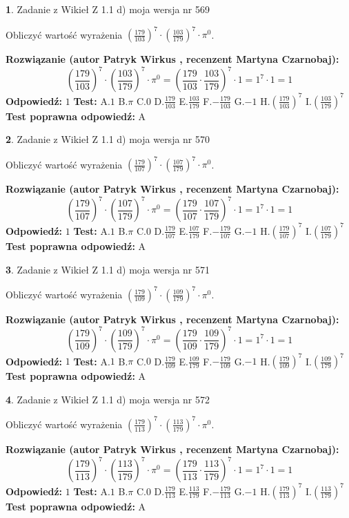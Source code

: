 \documentclass[12pt, a4paper]{article}
\theoremstyle{definition} %
\newtheorem{zad}{}
\newcommand{\zadStart}[1]{\begin{zad}#1\newline}
\newcommand{\zadStop}{\end{zad}}
\newcommand{\rozwStart}[2]{\noindent \textbf{Rozwiązanie (autor #1 , recenzent #2): }\newline}
\newcommand{\rozwStop}{\newline}
\newcommand{\odpStart}{\noindent \textbf{Odpowiedź:}\newline}
\newcommand{\odpStop}{\newline}
\newcommand{\testStart}{\noindent \textbf{Test:}\newline}
\newcommand{\testStop}{\newline}
\newcommand{\kluczStart}{\noindent \textbf{Test poprawna odpowiedź:}\newline}
\newcommand{\kluczStop}{\newline}
\begin{document}
\zadStart{Zadanie z Wikieł Z 1.1 d) moja wersja nr 569}

Obliczyć wartość wyrażenia $(\frac{179}{103})^{7} \cdot (\frac{103}{179})^{7} \cdot \pi^{0}$.
\zadStop
\rozwStart{Patryk Wirkus}{Martyna Czarnobaj}
$$(\frac{179}{103})^{7} \cdot (\frac{103}{179})^{7} \cdot \pi^{0} = (\frac{179}{103} \cdot \frac{103}{179})^{7} \cdot 1 = 1^{7} \cdot 1 = 1$$
\rozwStop
\odpStart
$1$
\odpStop
\testStart
A.$1$ B.$\pi$ C.$0$ D.$\frac{179}{103}$ E.$\frac{103}{179}$
F.$-\frac{179}{103}$ G.$-1$
H.$(\frac{179}{103})^{7}$
I.$(\frac{103}{179})^{7}$
\testStop
\kluczStart
A
\kluczStop



\zadStart{Zadanie z Wikieł Z 1.1 d) moja wersja nr 570}

Obliczyć wartość wyrażenia $(\frac{179}{107})^{7} \cdot (\frac{107}{179})^{7} \cdot \pi^{0}$.
\zadStop
\rozwStart{Patryk Wirkus}{Martyna Czarnobaj}
$$(\frac{179}{107})^{7} \cdot (\frac{107}{179})^{7} \cdot \pi^{0} = (\frac{179}{107} \cdot \frac{107}{179})^{7} \cdot 1 = 1^{7} \cdot 1 = 1$$
\rozwStop
\odpStart
$1$
\odpStop
\testStart
A.$1$ B.$\pi$ C.$0$ D.$\frac{179}{107}$ E.$\frac{107}{179}$
F.$-\frac{179}{107}$ G.$-1$
H.$(\frac{179}{107})^{7}$
I.$(\frac{107}{179})^{7}$
\testStop
\kluczStart
A
\kluczStop



\zadStart{Zadanie z Wikieł Z 1.1 d) moja wersja nr 571}

Obliczyć wartość wyrażenia $(\frac{179}{109})^{7} \cdot (\frac{109}{179})^{7} \cdot \pi^{0}$.
\zadStop
\rozwStart{Patryk Wirkus}{Martyna Czarnobaj}
$$(\frac{179}{109})^{7} \cdot (\frac{109}{179})^{7} \cdot \pi^{0} = (\frac{179}{109} \cdot \frac{109}{179})^{7} \cdot 1 = 1^{7} \cdot 1 = 1$$
\rozwStop
\odpStart
$1$
\odpStop
\testStart
A.$1$ B.$\pi$ C.$0$ D.$\frac{179}{109}$ E.$\frac{109}{179}$
F.$-\frac{179}{109}$ G.$-1$
H.$(\frac{179}{109})^{7}$
I.$(\frac{109}{179})^{7}$
\testStop
\kluczStart
A
\kluczStop



\zadStart{Zadanie z Wikieł Z 1.1 d) moja wersja nr 572}

Obliczyć wartość wyrażenia $(\frac{179}{113})^{7} \cdot (\frac{113}{179})^{7} \cdot \pi^{0}$.
\zadStop
\rozwStart{Patryk Wirkus}{Martyna Czarnobaj}
$$(\frac{179}{113})^{7} \cdot (\frac{113}{179})^{7} \cdot \pi^{0} = (\frac{179}{113} \cdot \frac{113}{179})^{7} \cdot 1 = 1^{7} \cdot 1 = 1$$
\rozwStop
\odpStart
$1$
\odpStop
\testStart
A.$1$ B.$\pi$ C.$0$ D.$\frac{179}{113}$ E.$\frac{113}{179}$
F.$-\frac{179}{113}$ G.$-1$
H.$(\frac{179}{113})^{7}$
I.$(\frac{113}{179})^{7}$
\testStop
\kluczStart
A
\kluczStop
\end{document}
